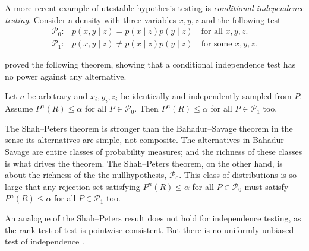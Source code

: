 A more recent example of utestable hypothesis testing is \emph{conditional
independence testing}. Consider a density with three variables $x,y,z$
and the following test
\begin{align*}
\mathcal{P}_{0}: & p(x,y\mid z)=p(x\mid z)p(y\mid z)\quad\textrm{for all }x,y,z.\\
\mathcal{P}_{1}: & p(x,y\mid z)\neq p(x\mid z)p(y\mid z)\quad\textrm{for some }x,y,z.
\end{align*}

\cite{Shah2018-jh} proved the following theorem, showing that a
conditional independence test has no power against any alternative. 
\begin{theorem}
\label{theorem:Shah--Peters}Let $n$ be arbitrary and $x_{i},y_{i},z_{i}$
be identically and independently sampled from $P$. Assume $P^{n}(R)\leq\alpha$
for all $P\in\mathcal{P}_{0}$. Then $P^{n}(R)\leq\alpha$ for all
$P\in\mathcal{P}_{1}$ too.
\end{theorem}

The Shah--Peters theorem is stronger than the Bahadur--Savage theorem
in the sense its alternatives are simple, not composite. The alternatives
in Bahadur--Savage are entire classes of probability measures; and
the richness of these classes is what drives the theorem. The Shah--Peters
theorem, on the other hand, is about the richness of the the nullhypothesis,
$\mathcal{P}_{0}$. This class of distributions is so large that any
rejection set satisfying $P^{n}(R)\leq\alpha$ for all $P\in\mathcal{P}_{0}$
must satisfy $P^{n}(R)\leq\alpha$ for all $P\in\mathcal{P}_{1}$
too.

An analogue of the Shah--Peters result does not hold for independence
testing, as the rank test of \cite{Hoeffding1948-nm} test is pointwise
consistent. But there is no uniformly unbiased test of independence
\parencite{Moss2020-bc}.
